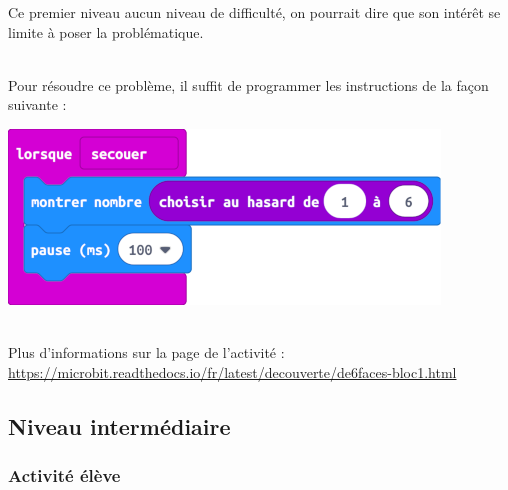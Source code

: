Ce premier niveau aucun niveau de difficulté, on pourrait dire que son intérêt se limite à poser la problématique.

\begin{minipage}[t]{0.5\linewidth}
    \begin{methode}
    ~\\Pour résoudre ce problème, il suffit de programmer les instructions de la façon suivante :
    
    \includegraphics[width=0.4\linewidth]{res/mbDe6FacesN1proposition.png}
    \end{methode}
\end{minipage}
\hfill
\begin{minipage}[t]{0.5\linewidth}
    \begin{remarque}
    ~\\Plus d'informations sur la page de l'activité :\\ \url{https://microbit.readthedocs.io/fr/latest/decouverte/de6faces-bloc1.html}
    \end{remarque}
\end{minipage}






%
%
\newpage
\subsection{Niveau intermédiaire}
\subsubsection{Activité élève}



